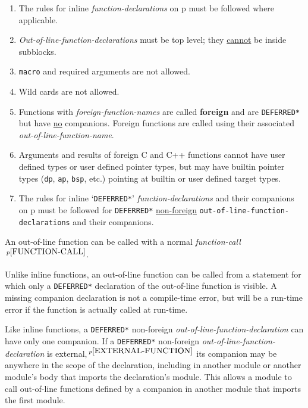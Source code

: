\documentclass[12pt]{article}
\newcommand{\key}[1]{{\rm \bfseries #1}}
\newcommand{\pagref}[1]{p\pageref{#1}}
\newcommand{\pagnote}[1]{$\,^{p\pageref{#1}}$}
\newenvironment{indpar}[1][0.3in]%
	{\begin{list}{}%
		     {\setlength{\itemsep}{0in}%
		      \setlength{\topsep}{0in}%
		      \setlength{\parsep}{1ex}%
		      \setlength{\labelwidth}{#1}%
		      \setlength{\leftmargin}{#1}%
		      \addtolength{\leftmargin}{\labelsep}}%
	 \item}%
	{\end{list}}
\begin{document}
\begin{indpar}
\begin{enumerate}
\item
The rules for inline {\em function-declarations} on
\pagref{FUNCTION-DECLARATION} must be followed where applicable.
\item
{\em Out-of-line-function-declarations} must be top level; they
\underline{cannot} be inside subblocks.
\item
{\tt macro} and required arguments are not allowed.
\item
Wild cards are not allowed.
\item Functions with {\em foreign-function-names} are called \key{foreign}
and are {\tt *DEFERRED*} but have \underline{no} companions.
Foreign functions are called using
their associated {\em out-of-line-function-name}.
\item
Arguments and results of foreign C and C++ functions cannot
have user defined types or user defined pointer types,
but may have builtin pointer types ({\tt dp}, {\tt ap}, {\tt bsp}, etc.)
pointing at builtin or user defined target types.
\item
The rules for inline `{\tt *DEFERRED*}'
{\em function-declarations} and
their companions on \pagref{COMPANION-DECLARATION}
must be followed for
{\tt *DEFERRED*} \underline{non-foreign}
{\tt out-of-line-function-de\-clar\-ations}
and their companions.
\end{enumerate}
\end{indpar}

An out-of-line function can be called with a normal
{\em function-call}\pagnote{FUNCTION-CALL}.

Unlike inline functions, an out-of-line function can
be called from a statement for which only a {\tt *DEFERRED*} declaration
of the out-of-line function is visible.  A missing companion
declaration is not a compile-time error, but will be a
run-time error if the function is actually called at run-time.

Like inline functions, a {\tt *DEFERRED*}
non-foreign {\em out-of-line-function-declaration}
can have only one companion.
If\label{OUT-OF-LINE-EXTERNAL-COMPANION}
a {\tt *DEFERRED*} non-foreign {\em out-of-line-function-declaration}
is ex\-ternal,\pagnote{EXTERNAL-FUNCTION}
its companion may be anywhere in the scope of the declaration,
including in another module or another module's body that imports
the declaration's module.
This allows a module to call out-of-line functions defined by
a companion in another module that imports the first module.
\end{document}
